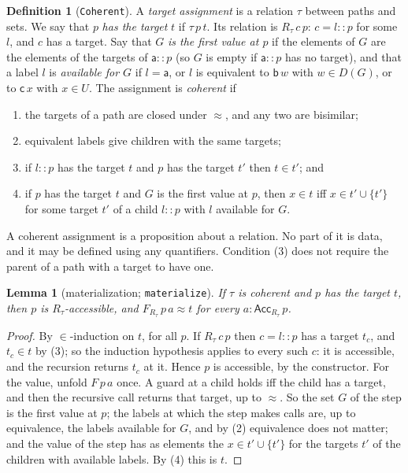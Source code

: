 \documentclass[10pt]{article}
\newtheorem{lemma}[theorem]{Lemma}
\theoremstyle{definition}
\newtheorem{definition}[theorem]{Definition}
\theoremstyle{remark}
\newcommand{\Acc}{\mathsf{Acc}}
\newcommand{\la}{\mathsf{a}}
\newcommand{\lb}{\mathsf{b}}
\newcommand{\lc}{\mathsf{c}}
\newcommand{\lean}[1]{\texttt{#1}}
\begin{document}
\begin{definition}[\lean{Coherent}]\label{def:coherent}
A \emph{target assignment} is a relation $\tau$ between paths and sets.
We say that $p$ \emph{has the target} $t$ if $\tau\,p\,t$. Its relation is
$R_\tau\,c\,p$: $c=l::p$ for some $l$, and $c$ has a target. Say that $G$
\emph{is the first value at $p$} if the elements of $G$ are the elements
of the targets of $\la::p$ (so $G$ is empty if $\la::p$ has no target),
and that a label $l$ is \emph{available for $G$} if $l=\la$, or $l$ is
equivalent to $\lb\,w$ with $w\in D(G)$, or to $\lc\,x$ with $x\in U$.
The assignment is \emph{coherent} if
\begin{enumerate}
\item the targets of a path are closed under $\approx$, and any two are
  bisimilar;
\item equivalent labels give children with the same targets;
\item if $l::p$ has the target $t$ and $p$ has the target $t'$ then
  $t\in t'$; and
\item if $p$ has the target $t$ and $G$ is the first value at $p$, then
  $x\in t$ iff $x\in t'\cup\{t'\}$ for some target $t'$ of a child $l::p$
  with $l$ available for $G$.
\end{enumerate}
\end{definition}

A coherent assignment is a proposition about a relation. No part of it
is data, and it may be defined using any quantifiers. Condition (3) does
not require the parent of a path with a target to have one.

\begin{lemma}[materialization; \lean{materialize}]\label{lem:mat}
If $\tau$ is coherent and $p$ has the target $t$, then $p$ is
$R_\tau$-accessible, and $F_{R_\tau}\,p\,a\approx t$ for every $a:\Acc_{R_\tau}\,p$.
\end{lemma}
\begin{proof}
By $\in$-induction on $t$, for all $p$. If $R_\tau\,c\,p$ then $c=l::p$ has a
target $t_c$, and $t_c\in t$ by (3); so the induction hypothesis applies
to every such $c$: it is accessible, and the recursion returns $t_c$ at
it. Hence $p$ is accessible, by the constructor. For the value, unfold
$F\,p\,a$ once. A guard at a child holds iff the child has a target, and
then the recursive call returns that target, up to $\approx$. So the set
$G$ of the step is the first value at $p$; the labels at which the step
makes calls are, up to equivalence, the labels available for $G$, and by
(2) equivalence does not matter; and the value of the step has as
elements the $x\in t'\cup\{t'\}$ for the targets $t'$ of the children with
available labels. By (4) this is $t$.
\end{proof}
\end{document}
